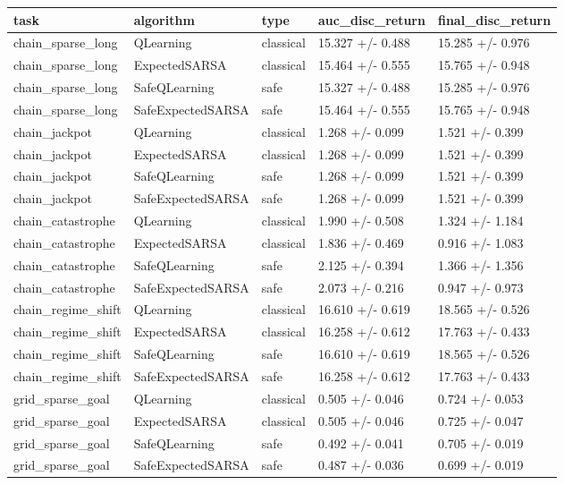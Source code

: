 \begin{tabular}{lllll}
\toprule
task & algorithm & type & auc_disc_return & final_disc_return \\
\midrule
chain_sparse_long & QLearning & classical & 15.327 +/- 0.488 & 15.285 +/- 0.976 \\
chain_sparse_long & ExpectedSARSA & classical & 15.464 +/- 0.555 & 15.765 +/- 0.948 \\
chain_sparse_long & SafeQLearning & safe & 15.327 +/- 0.488 & 15.285 +/- 0.976 \\
chain_sparse_long & SafeExpectedSARSA & safe & 15.464 +/- 0.555 & 15.765 +/- 0.948 \\
chain_jackpot & QLearning & classical & 1.268 +/- 0.099 & 1.521 +/- 0.399 \\
chain_jackpot & ExpectedSARSA & classical & 1.268 +/- 0.099 & 1.521 +/- 0.399 \\
chain_jackpot & SafeQLearning & safe & 1.268 +/- 0.099 & 1.521 +/- 0.399 \\
chain_jackpot & SafeExpectedSARSA & safe & 1.268 +/- 0.099 & 1.521 +/- 0.399 \\
chain_catastrophe & QLearning & classical & 1.990 +/- 0.508 & 1.324 +/- 1.184 \\
chain_catastrophe & ExpectedSARSA & classical & 1.836 +/- 0.469 & 0.916 +/- 1.083 \\
chain_catastrophe & SafeQLearning & safe & 2.125 +/- 0.394 & 1.366 +/- 1.356 \\
chain_catastrophe & SafeExpectedSARSA & safe & 2.073 +/- 0.216 & 0.947 +/- 0.973 \\
chain_regime_shift & QLearning & classical & 16.610 +/- 0.619 & 18.565 +/- 0.526 \\
chain_regime_shift & ExpectedSARSA & classical & 16.258 +/- 0.612 & 17.763 +/- 0.433 \\
chain_regime_shift & SafeQLearning & safe & 16.610 +/- 0.619 & 18.565 +/- 0.526 \\
chain_regime_shift & SafeExpectedSARSA & safe & 16.258 +/- 0.612 & 17.763 +/- 0.433 \\
grid_sparse_goal & QLearning & classical & 0.505 +/- 0.046 & 0.724 +/- 0.053 \\
grid_sparse_goal & ExpectedSARSA & classical & 0.505 +/- 0.046 & 0.725 +/- 0.047 \\
grid_sparse_goal & SafeQLearning & safe & 0.492 +/- 0.041 & 0.705 +/- 0.019 \\
grid_sparse_goal & SafeExpectedSARSA & safe & 0.487 +/- 0.036 & 0.699 +/- 0.019 \\

\end{tabular}
